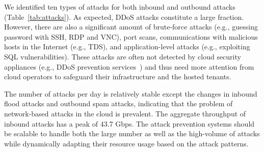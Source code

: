 \begin{encompact}
\item We identified ten types of attacks for both inbound and outbound attacks (Table~\ref{tab:attacks}). As expected, DDoS attacks constitute a large fraction. However, there are also a significant amount of brute-force attacks (e.g., guessing password with SSH, RDP and VNC), port scans, communications with malicious hosts in the Internet (e.g., TDS), and application-level attacks (e.g., exploiting SQL vulnerabilities). These attacks are often not detected by cloud security appliances (e.g., DDoS prevention services~\cite{arborworldwideinfrasecurityreport, Prolexic}) and thus need more attention from cloud operators to safeguard their infrastructure and the hosted tenants. 



\item The number of attacks per day is relatively stable except the changes in inbound flood attacks and outbound spam attacks, indicating that the problem of network-based 
attacks in the cloud is prevalent. 
The aggregate throughput of inbound attacks has a peak of 43.7 Gbps.
The attack prevention systems should be scalable to handle both the large number as well as the high-volume of attacks while dynamically adapting their resource usage based on the attack patterns.

%
%


\end{encompact}
